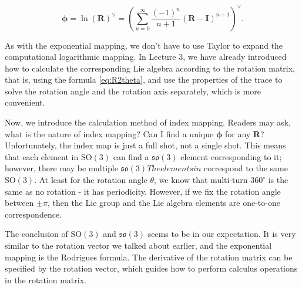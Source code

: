 \begin{equation}
\boldsymbol{\phi}  = \ln {\left( \bm{R} \right)^ \vee } = {\left( {\sum\limits_{n = 0}^\infty  {\frac{{{{\left( { - 1} \right)}^n}}}{{n + 1}}{{\left( { \bm{R} - \bm{I}} \right)}^{n + 1}}} } \right)^ \vee }.
\end{equation}

As with the exponential mapping, we don't have to use Taylor to expand the computational logarithmic mapping. In Lecture 3, we have already introduced how to calculate the corresponding Lie algebra according to the rotation matrix, that is, using the formula \eqref{eq:R2theta}, and use the properties of the trace to solve the rotation angle and the rotation axis separately, which is more convenient.

Now, we introduce the calculation method of index mapping. Readers may ask, what is the nature of index mapping? Can I find a unique $\boldsymbol{\phi}$ for any $\bm{R}$? Unfortunately, the index map is just a full shot, not a single shot. This means that each element in $\mathrm{SO}(3)$ can find a $\mathfrak{so}(3)$ element corresponding to it; however, there may be multiple $\mathfrak{so}( 3) The elements in $ correspond to the same $\mathrm{SO}(3)$. At least for the rotation angle $\theta$, we know that multi-turn $360^\circ$ is the same as no rotation - it has periodicity. However, if we fix the rotation angle between $\pm \pi$, then the Lie group and the Lie algebra elements are one-to-one correspondence.

The conclusion of $\mathrm{SO}(3)$ and $\mathfrak{so}(3)$ seems to be in our expectation. It is very similar to the rotation vector we talked about earlier, and the exponential mapping is the Rodrigues formula. The derivative of the rotation matrix can be specified by the rotation vector, which guides how to perform calculus operations in the rotation matrix.
